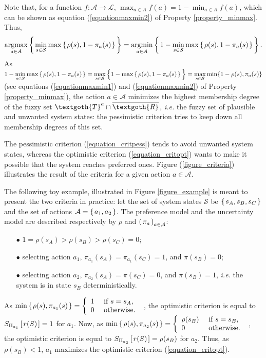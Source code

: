 Note that, for a function $f: \mathcal{A} \rightarrow \mathcal{L}$,
$\max_{a \in A} f(a) = 1 - \min_{a \in A} f(a)$,
which can be shown as equation (\ref{equationmaxmin2}) of Property \ref{property_minmax}.
Thus, 
\[\operatorname*{argmax}_{a \in A} \left\{ \left.  \displaystyle \min_{s \in  \mathcal{S}} \max\left\{ \left.  \rho(s),  1- \pi_a(s)  \right. \right\}  \right. \right\} = \operatorname*{argmin}_{a \in A} \left\{ \left.  \displaystyle 1 - \min_{s \in \mathcal{S}} \max\left\{ \left.  \rho(s), 1 - \pi_a(s)  \right. \right\}  \right. \right\}.\]
As  $1 - \displaystyle \min_{s \in \mathcal{S}} \max\left\{ \left.  \rho(s), 1 - \pi_a(s)  \right. \right\} = \displaystyle \max_{s \in \mathcal{S}} \Big\{ 1 - \max\left\{ \left.  \rho(s), 1 - \pi_a(s) \right. \right\} \Big\} =  \displaystyle \max_{s \in \mathcal{S}} \min\{ 1-\rho(s), \pi_a(s)  \}$ 
(see equations (\ref{equationmaxmin1}) and (\ref{equationmaxmin2}) of Property \ref{property_minmax}),
the action $a \in \mathcal{A}$ minimizes the highest membership degree 
of the fuzzy set $\textgoth{T}^a \cap \overline{\textgoth{R}}$,
\textit{i.e.} the fuzzy set of plausible and unwanted system states:
the pessimistic criterion tries to keep down all membership degrees of this set. 

The pessimistic criterion (\ref{equation_critpess}) tends to avoid unwanted system states,
whereas the optimistic criterion (\ref{equation_critopt}) wants to make it possible 
that the system reaches preferred ones.
Figure (\ref{figure_criteria}) illustrates the result of the criteria for a given action $a\in\mathcal{A}$.

The following toy example, illustrated in Figure \ref{figure_example} 
is meant to present the two criteria in practice:
let the set of system states $\mathcal{S}$ be $\left\{ \left.  s_A , s_B , s_C  \right. \right\}$
and the set of actions $\mathcal{A} = \left\{ \left.  a_1 , a_2  \right. \right\}$. 
The preference model and the uncertainty model are described respectively by $\rho$ and $\left( \left. \pi_a \right. \right)_{a \in \mathcal{A}}$:
\begin{itemize}
\item[$\bullet$] $1 = \rho(s_A) > \rho(s_B) > \rho(s_C) = 0$;
\item[$\bullet$] selecting action $a_1$, $\pi_{a_1}(s_A) = \pi_{a_1}(s_C) = 1$, and $\pi(s_B) = 0$;
\item[$\bullet$] selecting action $a_2$, $\pi_{a_2}(s_A) = \pi(s_C) = 0$, and $\pi(s_B) = 1$, \textit{i.e.}
the system is in state $s_B$ deterministically.
\end{itemize}
As $\min \left\{ \left.  \rho(s), \pi_{a_1}(s)  \right. \right\} = \left \{  \begin{array}{ll}
1 & \mbox{ if } s=s_A, \\
0 & \mbox{ otherwise. }
\end{array} \right.  $,
the optimistic criterion is equal to $S_{\Pi_{a_1}} \left[ \left.  r(S)  \right. \right] = 1$
for $a_1$.
Now, as $\min \left\{ \left.  \rho(s), \pi_{a_2}(s)  \right. \right\} = \left \{  \begin{array}{ll}
\rho(s_B) & \mbox{ if } s=s_B, \\
0 & \mbox{ otherwise. }
\end{array} \right.  $,
the optimistic criterion is equal to $S_{\Pi_{a_2}} \left[ \left.  r(S)  \right. \right] = \rho(s_B)$
for $a_2$. Thus, as $\rho(s_B)<1$, $a_1$ maximizes the optimistic criterion (\ref{equation_critopt}).

